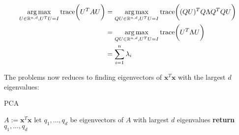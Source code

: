 \documentclass[../main.tex]{subfiles}
\begin{document}
\begin{equation} \label{eq4-1}
\begin{split}
\operatorname*{arg\,max}_{U\in\mathbb{R}^{n, d}, U^TU=I}\text{trace}\bigg(U^TAU\bigg) & = \operatorname*{arg\,max}_{QU\in\mathbb{R}^{n, d}, U^TU=I}\text{trace}\bigg((QU)^TQ\Lambda Q^TQU\bigg) \\
 & = \operatorname*{arg\,max}_{QU\in\mathbb{R}^{n, d}, U^TU=I}\text{trace}\bigg(U^T\Lambda U\bigg) \\
 & = \sum_{i=1}^n \lambda_i
\end{split}
\end{equation}

The problems now reduces to finding eigenvectors of $\textbf{x}^T\textbf{x}$ with the largest $d$ eigenvalues:
\smallskip\begin{algorithm}[H]
\caption{PCA}\label{pca}
\begin{algorithmic}[5]
  \State $A:=\textbf{x}^T\textbf{x}$
  \State let $q_1, ..., q_d$ be eigenvectors of $A$ with largest $d$ eigenvalues
  \State \textbf{return} $q_1, ..., q_d$
\EndProcedure
\end{algorithmic}
\end{algorithm}\smallskip
\end{document}
